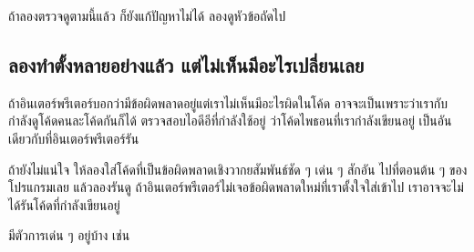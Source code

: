 ถ้าลองตรวจดูตามนี้แล้ว ก็ยังแก้ปัญหาไม่ได้ ลองดูหัวข้อถัดไป

\subsection{ลองทำตั้งหลายอย่างแล้ว แต่ไม่เห็นมีอะไรเปลี่ยนเลย}



ถ้าอินเตอร์พรีเตอร์บอกว่ามีข้อผิดพลาดอยู่แต่เราไม่เห็นมีอะไรผิดในโค้ด
อาจจะเป็นเพราะว่าเรากับกำลังดูโค้ดคนละโค้ดกันก็ได้
ตรวจสอบไอดีอีที่กำลังใช้อยู่ ว่าโค้ดไพธอนที่เรากำลังเขียนอยู่ เป็นอันเดียวกับที่อินเตอร์พรีเตอร์รัน


ถ้ายังไม่แน่ใจ ให้ลองใส่โค้ดที่เป็นข้อผิดพลาดเชิงวากยสัมพันธ์ชัด ๆ เด่น ๆ สักอัน ไปที่ตอนต้น ๆ ของโปรแกรมเลย แล้วลองรันดู
ถ้าอินเตอร์พรีเตอร์ไม่เจอข้อผิดพลาดใหม่ที่เราตั้งใจใส่เข้าไป เราอาจจะไม่ได้รันโค้ดที่กำลังเขียนอยู่


มีตัวการเด่น ๆ อยู่บ้าง เช่น

